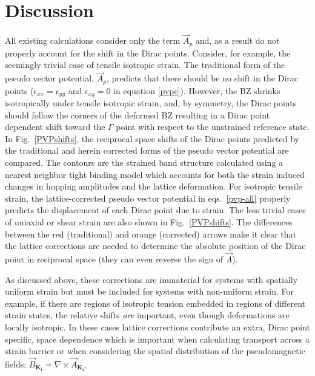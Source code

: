 \section{Discussion}

All existing calculations consider only the term $\vec{A}_p$ and, as a result do not properly account for the shift in the Dirac points.
Consider, for example, the seemingly trivial case of tensile isotropic strain.
The traditional form of the pseudo vector potential, $\vec{A}_p$, predicts that there should be no shift in the Dirac points ($\epsilon_{xx}=\epsilon_{yy}$ and $\epsilon_{xy}=0$ in equation \ref{pvpe}).
However, the BZ shrinks isotropically under tensile isotropic strain, and, by symmetry, the Dirac points should follow the corners of the deformed BZ resulting in a Dirac point dependent shift toward the $\Gamma$ point with respect to the unstrained reference state.
In Fig.~\ref{PVPshifts}, the reciprocal space shifts of the Dirac points predicted by the traditional and herein corrected forms of the pseudo vector potential are compared.
The contours are the strained band structure calculated using a nearest neighbor tight binding model which accounts for both the strain induced changes in hopping amplitudes and the lattice deformation\cite{Pereira2009}.
For isotropic tensile strain, the lattice-corrected pseudo vector potential in eqs.~\eqref{pvp-all} properly predicts the displacement of each Dirac point due to strain.
The less trivial cases of uniaxial or shear strain are also shown in Fig.~\ref{PVPshifts}. The differences between the red (traditional) and orange (corrected) arrows make it clear that the lattice corrections are needed to determine the absolute position of the Dirac point in reciprocal space (they can even reverse the sign of $\vec{A}$).

As discussed above, these corrections are immaterial for systems with spatially uniform strain but must be included for systems with non-uniform strain.
For example, if there are regions of isotropic tension embedded in regions of different strain states, the relative shifts \emph{are} important, even though deformations are locally isotropic.
In these cases lattice corrections contribute an extra, Dirac point specific, space dependence which is important when calculating transport across a strain barrier or when considering the spatial distribution of the pseudomagnetic fields: $\vec{B}_{\bm{K_i}} = \nabla \times \vec{A}_{\bm{K_i}}$.

